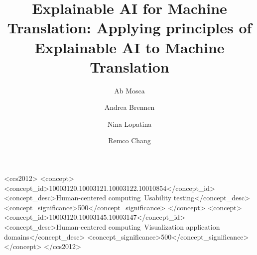 \documentclass[manuscript,screen]{acmart}
\begin{document}
\title[Explainable AI for Machine Translation]{Explainable AI for Machine Translation: Applying principles of Explainable AI to Machine Translation}

\author{Ab Mosca}

\author{Andrea Brennen}
\authornotemark[1]

\author{Nina Lopatina}
\author{Remco Chang}

\renewcommand{\shortauthors}{Mosca and Brennen, et al.}

\begin{abstract}
  
\end{abstract}

\begin{CCSXML}
<ccs2012>
<concept>
<concept_id>10003120.10003121.10003122.10010854</concept_id>
<concept_desc>Human-centered computing~Usability testing</concept_desc>
<concept_significance>500</concept_significance>
</concept>
<concept>
<concept_id>10003120.10003145.10003147</concept_id>
<concept_desc>Human-centered computing~Visualization application domains</concept_desc>
<concept_significance>500</concept_significance>
</concept>
</ccs2012>
\end{CCSXML}

\end{document}
